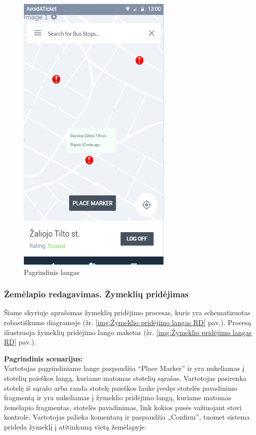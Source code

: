 \documentclass{VUMIFPSkursinis}
\begin{document}
	\begin{figure}[H]
				\centering
				\includegraphics[scale=0.6]{img/mockup_Main_Window}
				\caption{Pagrindinis langas}
				\label{img:Pagrindinis langas}
			\end{figure}

\subsubsection{Žemėlapio redagavimas. Žymeklių pridėjimas}
	Šiame skyriuje aprašomas žymeklių pridėjimo procesas, kuris yra schematizuotas robastiškumo diagramoje (žr. \ref{img:Žymeklio pridėjimo langas RD} pav.). 
	Procesą iliustruoja žymeklių pridėjimo lango maketas (žr. \ref{img:Žymeklio pridėjimo langas RD} pav.).

	\textbf{Pagrindinis scenarijus:}\\
	Vartotojas pagrindiniame lange paspaudžia “Place Marker” ir yra nukeliamas į stotelių paieškos langą, kuriame matomas stotelių sąrašas. Vartotojas pasirenka stotelę iš sąrašo arba randa stotelę paieškos lauke įvedęs stotelės pavadinimo fragmentą ir yra nukeliamas į žymeklio pridėjimo langą, kuriame matomas žemėlapio fragmentas, stotelės pavadinimas, link kokios pusės važiuojant stovi kontrolė. Vartotojas palieka komentarą ir paspaudžia „Confirm”, tuomet sistema prideda žymeklį į atitinkamą vietą žemėlapyje.
\end{document}
